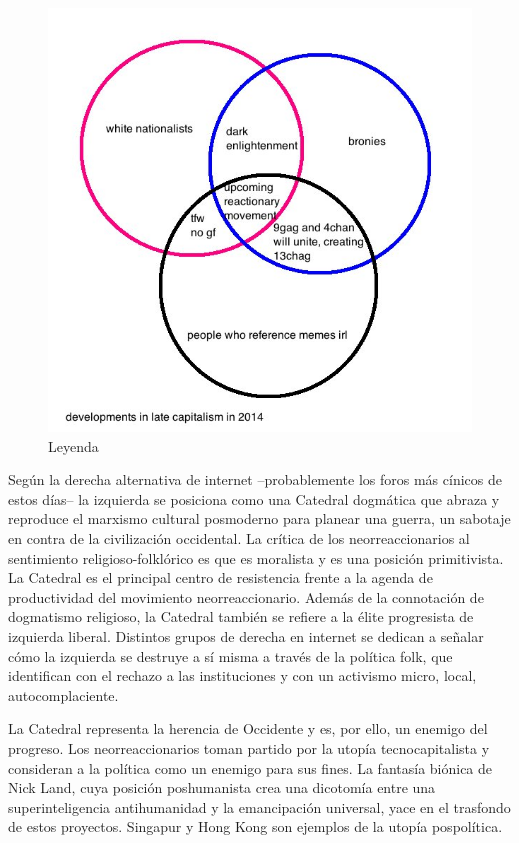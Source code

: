 \begin{figure}[htb]
  \centering
  \includegraphics[width=0.7\linewidth]{images/internet-capitalism-2014.png}
  \caption{Leyenda}
  \label{fig:capitalism2014}
\end{figure}

Según la derecha alternativa de internet --probablemente los foros más cínicos de estos días-- la izquierda se posiciona como una Catedral dogmática que abraza y reproduce el marxismo cultural posmoderno para planear una guerra, un sabotaje en contra de la civilización occidental. La crítica de los neorreaccionarios al sentimiento religioso-folklórico es que es moralista y es una posición primitivista. La Catedral es el principal centro de resistencia frente a la agenda de productividad del movimiento neorreaccionario. Además de la connotación de dogmatismo religioso, la Catedral también se refiere a la élite progresista de izquierda liberal. Distintos grupos de derecha en internet se dedican a señalar cómo la izquierda se destruye a sí misma a través de la política folk, que identifican con el rechazo a las instituciones y con un activismo micro, local, autocomplaciente.

La Catedral representa la herencia de Occidente y es, por ello, un enemigo del progreso. Los neorreaccionarios toman partido por la utopía tecnocapitalista y consideran a la política como un enemigo para sus fines. La fantasía biónica de Nick Land, cuya posición poshumanista crea una dicotomía entre una superinteligencia antihumanidad y la emancipación universal, yace en el trasfondo de estos proyectos. Singapur y Hong Kong son ejemplos de la utopía pospolítica.

